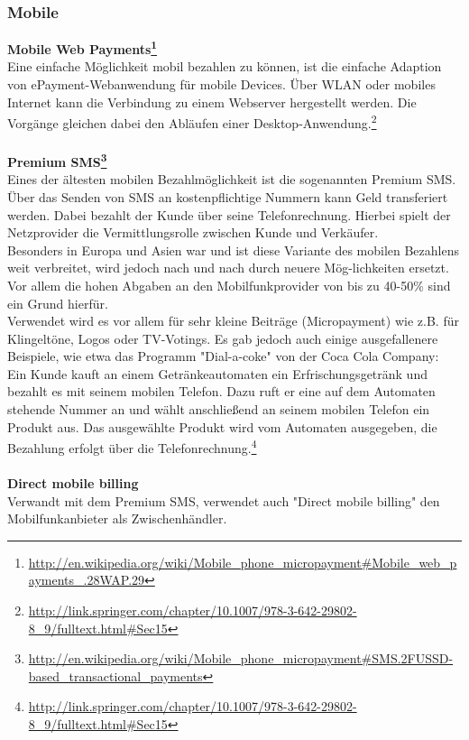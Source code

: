 \subsubsection{Mobile}
\textbf{Mobile Web Payments\footnote{\url{http://en.wikipedia.org/wiki/Mobile_phone_micropayment\#Mobile_web_payments_.28WAP.29}}}\\
Eine einfache Möglichkeit mobil bezahlen zu können, ist die einfache Adaption von ePayment-Webanwendung für mobile Devices. Über WLAN oder mobiles Internet kann die Verbindung zu einem Webserver hergestellt werden. Die Vorgänge gleichen dabei den Abläufen einer Desktop-Anwendung.\footnote{\url{http://link.springer.com/chapter/10.1007/978-3-642-29802-8_9/fulltext.html\#Sec15}}\\
\\
\textbf{Premium SMS\footnote{\url{http://en.wikipedia.org/wiki/Mobile_phone_micropayment\#SMS.2FUSSD-based_transactional_payments}}}\\
Eines der ältesten mobilen Bezahlmöglichkeit ist die sogenannten Premium SMS. Über das Senden von SMS an kostenpflichtige Nummern kann Geld transferiert werden. Dabei bezahlt der Kunde über seine Telefonrechnung. Hierbei spielt der Netzprovider die Vermittlungsrolle zwischen Kunde und Verkäufer.\\
Besonders in Europa und Asien war und ist diese Variante des mobilen Bezahlens weit verbreitet, wird jedoch nach und nach durch neuere Mög-lichkeiten ersetzt. Vor allem die hohen Abgaben an den Mobilfunkprovider von bis zu 40-50\% sind ein Grund hierfür.\\
Verwendet wird es vor allem für sehr kleine Beiträge (Micropayment) wie z.B. für Klingeltöne, Logos oder TV-Votings. Es gab jedoch auch einige ausgefallenere Beispiele, wie etwa das Programm "Dial-a-coke" von der Coca Cola Company: Ein Kunde kauft an einem Getränkeautomaten ein Erfrischungsgetränk und bezahlt es mit seinem mobilen Telefon. Dazu ruft er eine auf dem Automaten stehende Nummer an und wählt anschließend an seinem mobilen Telefon ein Produkt aus. Das ausgewählte Produkt wird vom Automaten ausgegeben, die Bezahlung erfolgt über die Telefonrechnung.\footnote{\url{http://link.springer.com/chapter/10.1007/978-3-642-29802-8_9/fulltext.html\#Sec15}}\\
\\
\textbf{Direct mobile billing}\\
Verwandt mit dem Premium SMS, verwendet auch "Direct mobile billing" den Mobilfunkanbieter als Zwischenhändler.\\
